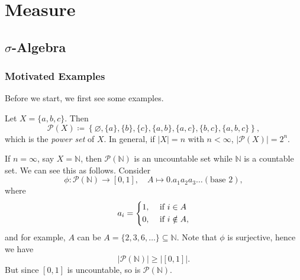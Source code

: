 \chapter{Measure}\label{ch:Measure}
\section{\(\sigma\)-Algebra}
\subsection{Motivated Examples}
Before we start, we first see some examples.
\begin{eg}
	Let \(X = \{a, b, c\}\). Then
	\[
		\mathcal{P}(X)\coloneqq \left\{\varnothing , \{a\}, \{b\}, \{c\}, \{a, b\}, \{a, c\}, \{b, c\}, \{a, b, c\}\right\},
	\]
	which is the \emph{power set} of \(X\). In general, if \(\vert X  \vert = n\) with \(n< \infty\), \(\vert \mathcal{P}(X) \vert = 2^n\).
\end{eg}
\begin{eg}
	If \(n = \infty\), say \(X = \mathbb{N} \), then \(\mathcal{P} (\mathbb{N} )\) is an uncountable set while \(\mathbb{N}\) is a countable set. We can see this as follows. Consider
	\[
		\phi\colon \mathcal{P}(\mathbb{N}) \to \left[0, 1\right],\quad A\mapsto 0.a_1 a_2 a_3 \dots (\text{base }2),
	\]
	where
	\[
		a_i = \begin{dcases}
			1, & \text{ if } i\in A     \\
			0, & \text{ if } i\notin A,
		\end{dcases}
	\]
	and for example, \(A\) can be
	\(A = \{2, 3, 6, \dots  \}\subseteq \mathbb{N}\). Note that \(\phi\) is surjective, hence we have
	\[
		\vert \mathcal{P}(\mathbb{N} ) \vert \geq \vert [0, 1] \vert.
	\]
	But since \([0, 1]\) is uncountable, so is \(\mathcal{P} (\mathbb{N} )\).
\end{eg}

